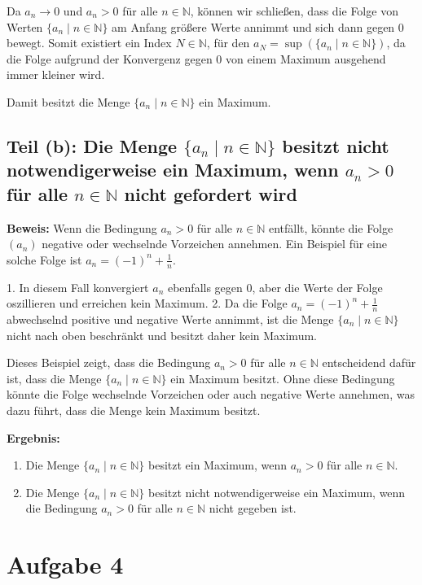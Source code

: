 \documentclass[11pt]{article}
\begin{document}
Da \( a_n \to 0 \) und \( a_n > 0 \) für alle \( n \in \mathbb{N} \), können wir schließen, dass die Folge von Werten \( \{a_n \mid n \in \mathbb{N}\} \) am Anfang größere Werte annimmt und sich dann gegen 0 bewegt. Somit existiert ein Index \( N \in \mathbb{N} \), für den \( a_N = \sup(\{a_n \mid n \in \mathbb{N}\}) \), da die Folge aufgrund der Konvergenz gegen 0 von einem Maximum ausgehend immer kleiner wird.

Damit besitzt die Menge \( \{a_n \mid n \in \mathbb{N}\} \) ein Maximum.

\subsection*{Teil (b): Die Menge \( \{a_n \mid n \in \mathbb{N}\} \) besitzt nicht notwendigerweise ein Maximum, wenn \( a_n > 0 \) für alle \( n \in \mathbb{N} \) nicht gefordert wird}

\textbf{Beweis:}
Wenn die Bedingung \( a_n > 0 \) für alle \( n \in \mathbb{N} \) entfällt, könnte die Folge \( (a_n) \) negative oder wechselnde Vorzeichen annehmen. Ein Beispiel für eine solche Folge ist \( a_n = (-1)^n + \frac{1}{n} \).

1. In diesem Fall konvergiert \( a_n \) ebenfalls gegen 0, aber die Werte der Folge oszillieren und erreichen kein Maximum.
2. Da die Folge \( a_n = (-1)^n + \frac{1}{n} \) abwechselnd positive und negative Werte annimmt, ist die Menge \( \{a_n \mid n \in \mathbb{N}\} \) nicht nach oben beschränkt und besitzt daher kein Maximum.

Dieses Beispiel zeigt, dass die Bedingung \( a_n > 0 \) für alle \( n \in \mathbb{N} \) entscheidend dafür ist, dass die Menge \( \{a_n \mid n \in \mathbb{N}\} \) ein Maximum besitzt. Ohne diese Bedingung könnte die Folge wechselnde Vorzeichen oder auch negative Werte annehmen, was dazu führt, dass die Menge kein Maximum besitzt.

\textbf{Ergebnis:}
\begin{enumerate}
    \item Die Menge \( \{a_n \mid n \in \mathbb{N}\} \) besitzt ein Maximum, wenn \( a_n > 0 \) für alle \( n \in \mathbb{N} \).
    \item Die Menge \( \{a_n \mid n \in \mathbb{N}\} \) besitzt nicht notwendigerweise ein Maximum, wenn die Bedingung \( a_n > 0 \) für alle \( n \in \mathbb{N} \) nicht gegeben ist.
\end{enumerate}

\section*{Aufgabe 4}
\end{document}
